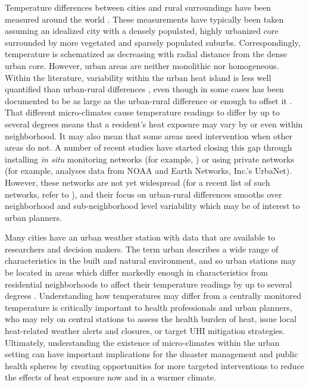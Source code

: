 Temperature differences between cities and rural surroundings have been measured around the world \citep{oke82}. These measurements have typically been taken assuming an idealized city with a densely populated, highly urbanized core surrounded by more vegetated and sparsely populated suburbs. Correspondingly, temperature is schematized as decreasing with radial distance from the dense urban core.
However, urban areas are neither monolithic nor homogeneous. 
Within the literature, variability within the urban heat island is less well quantified than urban-rural differences \citep{arnfield}, even though in some cases has been documented to be as large as the urban-rural difference or enough to offset it \citep{intraurbanvariabilityUHI}. 
That different micro-climates cause temperature readings to differ by up to several degrees \citep{lcz} means that a resident's heat exposure may vary by or even within neighborhood. It may also mean that some areas need intervention when other areas do not. 
A number of recent studies have started closing this gap through installing \textit{in situ} monitoring networks (for example, \citet{birminghamukUHI, madisonUHI,tokyoUHI, minneapolisUHI}) or using private networks (for example,  \citet{vanosstudentthesis} analyses data from NOAA and Earth Networks, Inc.'s UrbaNet). However, these networks are not yet widespread (for a recent list of such networks, refer to \cite{madisonUHI}), and their focus on urban-rural differences smooths over neighborhood and sub-neighborhood level variability which may be of interest to urban planners. 

 Many cities have an urban weather station with data that are available to researchers and decision makers. The term urban describes a wide range of characteristics in the built and natural environment, and so urban stations may be located in areas which differ markedly enough in characteristics from residential neighborhoods to affect their temperature readings by up to several degrees \citep{lcz}. Understanding how temperatures may differ from a centrally monitored temperature is critically important to health professionals and urban planners, who may rely on central stations to assess the health burden of heat, issue local heat-related weather alerts and closures, or target UHI mitigation strategies. Ultimately, understanding the existence of micro-climates within the urban setting can have important implications for the disaster management and public health spheres by creating opportunities for more targeted interventions to reduce the effects of heat exposure now and in a warmer climate.

